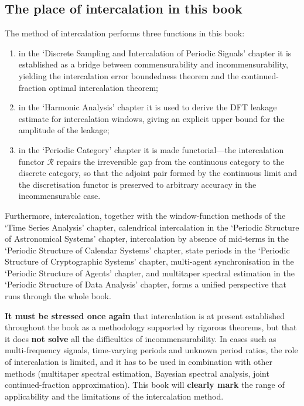 \subsection*{The place of intercalation in this book}

The method of intercalation performs three functions in this book:
\begin{enumerate}[leftmargin=2em, label={(\arabic*)}]
    \item in the `Discrete Sampling and Intercalation of Periodic Signals' chapter it is established as a bridge between commensurability and incommensurability, yielding the intercalation error boundedness theorem and the continued-fraction optimal intercalation theorem;
    \item in the `Harmonic Analysis' chapter it is used to derive the DFT leakage estimate for intercalation windows, giving an explicit upper bound for the amplitude of the leakage;
    \item in the `Periodic Category' chapter it is made functorial---the intercalation functor $\mathcal{R}$ repairs the irreversible gap from the continuous category to the discrete category, so that the adjoint pair formed by the continuous limit and the discretisation functor is preserved to arbitrary accuracy in the incommensurable case.
\end{enumerate}
Furthermore, intercalation, together with the window-function methods of the `Time Series Analysis' chapter, calendrical intercalation in the `Periodic Structure of Astronomical Systems' chapter, intercalation by absence of mid-terms in the `Periodic Structure of Calendar Systems' chapter, state periods in the `Periodic Structure of Cryptographic Systems' chapter, multi-agent synchronisation in the `Periodic Structure of Agents' chapter, and multitaper spectral estimation in the `Periodic Structure of Data Analysis' chapter, forms a unified perspective that runs through the whole book.

\textbf{It must be stressed once again} that intercalation is at present established throughout the book as a methodology supported by rigorous theorems, but that it does \textbf{not solve} all the difficulties of incommensurability. In cases such as multi-frequency signals, time-varying periods and unknown period ratios, the role of intercalation is limited, and it has to be used in combination with other methods (multitaper spectral estimation, Bayesian spectral analysis, joint continued-fraction approximation). This book will \textbf{clearly mark} the range of applicability and the limitations of the intercalation method.

